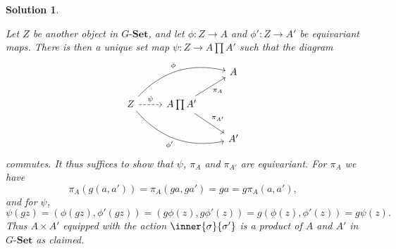 \documentclass[article, a4paper, 11pt, oneside]{memoir}
\numberwithin{equation}{chapter}
\newcommand{\ncat}[1]{\mathbf{#1}} %
\newcommand{\catSet}{\ncat{Set}} %
\theoremstyle{nonumberplain}
\newtheorem{solution}{Solution}
\newcommand{\catGSet}[1][G]{{#1\text{-}\catSet}}
\begin{document}
\begin{solution}
\begin{proofsec}
    Let $Z$ be another object in $\catGSet$, and let $\phi \colon Z \to A$ and $\phi' \colon Z \to A'$ be equivariant maps. There is then a unique set map $\psi \colon Z \to A \prod A'$ such that the diagram
    \begin{equation*}
        \begin{tikzcd}
            && A \\
            Z
                \ar[r, "\psi", dashed]
                \ar[urr, "\phi", bend left]
                \ar[drr, "\phi'", bend right, swap]
            & A \prod A'
                \ar[ur, "\pi_A", swap]
                \ar[dr, "\pi_{A'}"] \\
            && A'
        \end{tikzcd}
    \end{equation*}
    commutes. It thus suffices to show that $\psi$, $\pi_A$ and $\pi_{A'}$ are equivariant. For $\pi_A$ we have
    \begin{equation*}
        \pi_A(g(a,a'))
            = \pi_A(ga,ga')
            = ga
            = g \pi_A(a,a'),
    \end{equation*}
    and for $\psi$,
    \begin{equation*}
        \psi(gz)
            = (\phi(gz), \phi'(gz))
            = (g\phi(z), g\phi'(z))
            = g(\phi(z), \phi'(z))
            = g \psi(z).
    \end{equation*}
    Thus $A \times A'$ equipped with the action $\inner{\sigma}{\sigma'}$ is a product of $A$ and $A'$ in $\catGSet$ as claimed.


\end{proofsec}
\end{solution}
\end{document}
